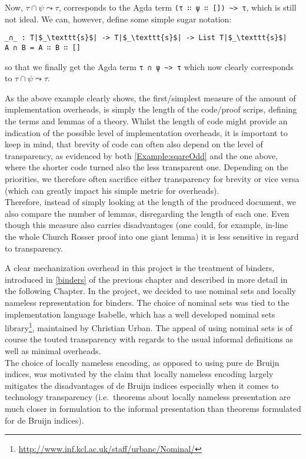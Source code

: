\documentclass[a4paper, 12pt, twoside]{style/ociamthesis}
\theoremstyle{plain}
\theoremstyle{definition}
\newtheorem{Example}{Example}[chapter]
\theoremstyle{remark}
\newtheorem*{Remark}{Remark}
\renewcommand{\href}[2]{#2\footnote{\url{#1}}}
\renewenvironment{Example}{\begin{OldExample}\begin{mdframed}[style=example, linecolor=yellow]}{\end{mdframed}\end{OldExample}}
\renewenvironment{Remark}{\begin{OldRemark}\begin{mdframed}[style=example, linecolor=black]}{\end{mdframed}\end{OldRemark}}
\begin{document}
\begin{Example}
\begin{Remark}
\end{Remark}

Now, \(\tau \cap \psi \leadsto \tau\), corresponds to the Agda term
\texttt{(τ ∷ ψ ∷ [])  \textasciitilde > τ}, which is still not ideal. We
can, however, define some simple sugar notation:

\begin{verbatim}
_∩_ : T|$_\texttt{s}$| -> T|$_\texttt{s}$| -> List T|$_\texttt{s}$|
A ∩ B = A ∷ B ∷ []
\end{verbatim}

so that we finally get the Agda term \texttt{τ ∩ ψ \textasciitilde > τ}
which now clearly corresponds to \(\tau \cap \psi \leadsto \tau\).

\end{Example}

As the above example clearly shows, the first/simplest measure of the
amount of implementation overheads, is simply the length of the
code/proof scrips, defining the terms and lemmas of a theory. Whilst the
length of code might provide an indication of the possible level of
implementation overheads, it is important to keep in mind, that brevity
of code can often also depend on the level of transparency, as evidenced
by both \cref{Example:sqareOdd} and the one above, where the shorter
code turned also the less transparent one. Depending on the priorities,
we therefore often sacrifice either transparency for brevity or vice
versa (which can greatly impact his simple metric for overheads).\\
Therefore, instead of simply looking at the length of the produced
document, we also compare the number of lemmas, disregarding the length
of each one. Even though this measure also carries disadvantages (one
could, for example, in-line the whole Church Rosser proof into one giant
lemma) it is less sensitive in regard to transparency.

A clear mechanization overhead in this project is the treatment of
binders, introduced in \cref{binders} of the previous chapter and
described in more detail in the following Chapter. In the project, we
decided to use nominal sets and locally nameless representation for
binders. The choice of nominal sets was tied to the implementation
language Isabelle, which has a well developed
\href{http://www.inf.kcl.ac.uk/staff/urbanc/Nominal/}{nominal sets
library}, maintained by Christian Urban. The appeal of using nominal
sets is of course the touted transparency with regards to the usual
informal definitions as well as minimal overheads.\\
The choice of locally nameless encoding, as opposed to using pure de
Bruijn indices, was motivated by the claim that locally nameless
encoding largely mitigates the disadvantages of de Bruijn indices
especially when it comes to technology transparency (i.e.~theorems about
locally nameless presentation are much closer in formulation to the
informal presentation than theorems formulated for de Bruijn indices).
\end{document}
